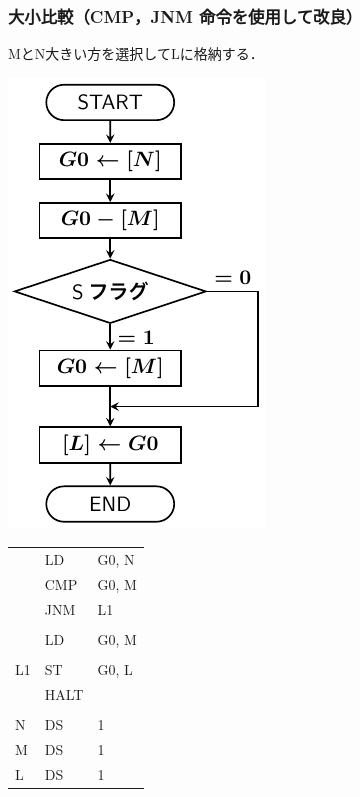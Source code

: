\documentclass[handout]{beamer}        %
\begin{document}
\begin{frame}
  \frametitle{大小比較（CMP，JNM 命令を使用して改良）}
  MとN大きい方を選択してLに格納する．\\
  \vfill
  \begin{minipage}{0.5\columnwidth}
    \centerline{\includegraphics[scale=0.75]{../Tikz/flowJ.pdf}}
  \end{minipage}
  \begin{minipage}{0.48\columnwidth}
    {\ttfamily\footnotesize
      \begin{tabular}{|l|l|l|}
              & LD     & G0, N    \\
              & CMP    & G0, M    \\
              & JNM    & L1       \\
              &        &          \\
              & LD     & G0, M    \\
              &        &          \\
      L1      & ST     & G0, L    \\
              & HALT   &          \\
              &        &          \\
      N       & DS     & 1        \\
      M       & DS     & 1        \\
      L       & DS     & 1        \\
    \end{tabular}}
    \vfill
  \end{minipage}
\end{frame}
\end{document}

